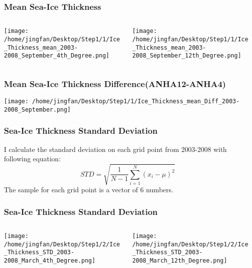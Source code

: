 \documentclass{beamer}
\begin{document}
\begin{frame}
\frametitle{Mean Sea-Ice Thickness}

\begin{columns}
\begin{column}[t]{0.5\linewidth}
\centering
\texttt{[image: /home/jingfan/Desktop/Step1/1/Ice\_Thickness\_mean\_2003-2008\_September\_4th\_Degree.png]}
\end{column}
\begin{column}[t]{0.5\linewidth}
\centering
\texttt{[image: /home/jingfan/Desktop/Step1/1/Ice\_Thickness\_mean\_2003-2008\_September\_12th\_Degree.png]}
\end{column}
\end{columns}

\end{frame}

\begin{frame}
\frametitle{Mean Sea-Ice Thickness Difference(ANHA12-ANHA4)}

\texttt{[image: /home/jingfan/Desktop/Step1/1/Ice\_Thickness\_mean\_Diff\_2003-2008\_September.png]}

\end{frame}

\begin{frame}
\frametitle{Sea-Ice Thickness Standard Deviation}
I calculate the standard deviation on each grid point from 2003-2008 with following equation: $$ STD = \sqrt{\frac{1}{N-1}\sum^N_{i=1}(x_i-\mu)^2} $$
The sample for each grid point is a vector of 6 numbers.
\end{frame}

\begin{frame}
\frametitle{Sea-Ice Thickness Standard Deviation}

\begin{columns}
\begin{column}[t]{0.5\linewidth}
\centering
\texttt{[image: /home/jingfan/Desktop/Step1/2/Ice\_Thickness\_STD\_2003-2008\_March\_4th\_Degree.png]}
\end{column}
\begin{column}[t]{0.5\linewidth}
\centering
\texttt{[image: /home/jingfan/Desktop/Step1/2/Ice\_Thickness\_STD\_2003-2008\_March\_12th\_Degree.png]}
\end{column}
\end{columns}

\end{frame}
\end{document}
